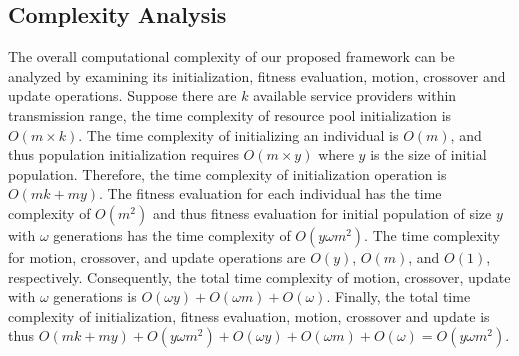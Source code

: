 \documentclass[journal]{IEEEtran}
\begin{document}
\subsection{Complexity Analysis}
The overall computational complexity of our proposed framework can be analyzed by examining its initialization, fitness evaluation, motion, crossover and update operations. 
Suppose there are $k$ available service providers within transmission range, the time complexity of resource pool initialization is $O(m \times k)$. The time complexity of initializing an individual is $O(m)$, and thus population initialization requires $O(m \times y)$ where $y$ is the size of initial population. Therefore, the time complexity of initialization operation is $O(mk + my)$.
The fitness evaluation for each individual has the time complexity of $O(m^2)$ and thus fitness evaluation for initial population of size $y$ with $\omega$ generations has the time complexity of $O(y\omega m^2)$.
The time complexity for motion, crossover, and update operations are $O(y)$, $O(m)$, and $O(1)$, respectively. Consequently, the total time complexity of motion, crossover, update with $\omega$ generations is $O(\omega y) + O(\omega m) + O(\omega)$.
Finally, the total time complexity of initialization, fitness evaluation, motion, crossover and update is thus $O(mk+my) + O(y\omega m^2) + O(\omega y) + O(\omega m) + O(\omega) = O(y \omega m^2)$.
\end{document}
